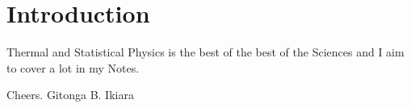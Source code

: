 \chapter*{Introduction}
Thermal and Statistical Physics is the best of the best of the Sciences and I
aim to cover a lot in my Notes.

Cheers.
Gitonga B. Ikiara
\pagebreak
